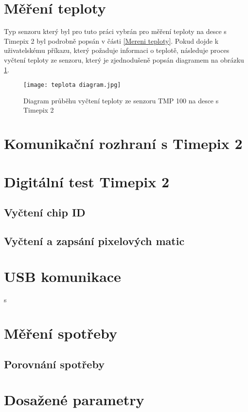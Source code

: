 \section{Měření teploty}
Typ senzoru který byl pro tuto práci vybrán pro měření teploty na desce s Timepix 2 byl podrobně popsán v části \ref{Mereni teploty}. Pokud dojde k uživatelskému příkazu, který požaduje informaci o teplotě, následuje proces vyčtení teploty ze senzoru, který je zjednodušeně popsán diagramem na obrázku \ref{fig:diagram}.
\begin{figure}[h!]
	\centering
	\captionsetup{justification=centering}
	\texttt{[image: teplota diagram.jpg]}
	\caption{Diagram průběhu vyčtení teploty ze senzoru TMP 100 na desce s Timepix 2} 
	\label{fig:diagram}
\end{figure}

\section{Komunikační rozhraní s Timepix 2}		%

\section{Digitální test Timepix 2} %
	\subsection{Vyčtení chip ID}
	\subsection{Vyčtení a zapsání pixelových matic}
\section{USB komunikace}s

\section{Měření spotřeby}
	\subsection{Porovnání spotřeby} %
	
\section{Dosažené parametry}
